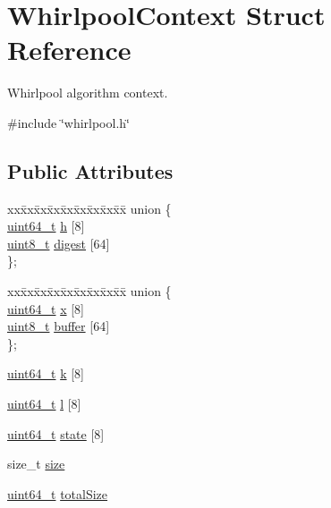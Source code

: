 \hypertarget{structWhirlpoolContext}{}\section{Whirlpool\+Context Struct Reference}
\label{structWhirlpoolContext}


Whirlpool algorithm context.  




{\ttfamily \#include \char`\"{}whirlpool.\+h\char`\"{}}

\subsection*{Public Attributes}
\begin{DoxyCompactItemize}
\item 
\begin{tabbing}
xx\=xx\=xx\=xx\=xx\=xx\=xx\=xx\=xx\=\kill
union \{\\
\>\hyperlink{stdint_8h_aec6fcb673ff035718c238c8c9d544c47}{uint64\_t} \hyperlink{structWhirlpoolContext_a25cc44a7c21c2bb3686cc19b95783a83}{h} \mbox{[}8\mbox{]}\\
\>\hyperlink{stdint_8h_aba7bc1797add20fe3efdf37ced1182c5}{uint8\_t} \hyperlink{structWhirlpoolContext_a797f258a426a4f5f2de2f3572cb02e25}{digest} \mbox{[}64\mbox{]}\\
\}; \\

\end{tabbing}\item 
\begin{tabbing}
xx\=xx\=xx\=xx\=xx\=xx\=xx\=xx\=xx\=\kill
union \{\\
\>\hyperlink{stdint_8h_aec6fcb673ff035718c238c8c9d544c47}{uint64\_t} \hyperlink{structWhirlpoolContext_a31944f1f23b15f9c15db3b17d1c07eb4}{x} \mbox{[}8\mbox{]}\\
\>\hyperlink{stdint_8h_aba7bc1797add20fe3efdf37ced1182c5}{uint8\_t} \hyperlink{structWhirlpoolContext_a884c918532249ee9bb31e50ef88bfb07}{buffer} \mbox{[}64\mbox{]}\\
\}; \\

\end{tabbing}\item 
\hyperlink{stdint_8h_aec6fcb673ff035718c238c8c9d544c47}{uint64\+\_\+t} \hyperlink{structWhirlpoolContext_a89a25dce17ea119db7c22a74b4424fd9}{k} \mbox{[}8\mbox{]}
\item 
\hyperlink{stdint_8h_aec6fcb673ff035718c238c8c9d544c47}{uint64\+\_\+t} \hyperlink{structWhirlpoolContext_ad3194c0b7a6c4e1ea1d0552943a1490f}{l} \mbox{[}8\mbox{]}
\item 
\hyperlink{stdint_8h_aec6fcb673ff035718c238c8c9d544c47}{uint64\+\_\+t} \hyperlink{structWhirlpoolContext_a5618839a2d02bf3e1282290f8d79a353}{state} \mbox{[}8\mbox{]}
\item 
size\+\_\+t \hyperlink{structWhirlpoolContext_a35dddd961573cb16dfaa2ffaf0c3fba1}{size}
\item 
\hyperlink{stdint_8h_aec6fcb673ff035718c238c8c9d544c47}{uint64\+\_\+t} \hyperlink{structWhirlpoolContext_a5723d1b91fce5cb012b66bc21d626a43}{total\+Size}
\end{DoxyCompactItemize}


